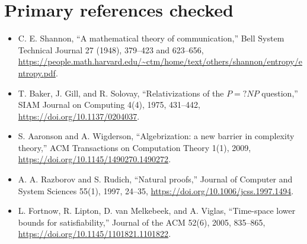 \documentclass[11pt]{article}
\begin{document}
\section*{Primary references checked}
\begin{itemize}
\item C. E. Shannon, ``A mathematical theory of communication,'' Bell System
Technical Journal 27 (1948), 379--423 and 623--656,
\url{https://people.math.harvard.edu/~ctm/home/text/others/shannon/entropy/entropy.pdf}.
\item T. Baker, J. Gill, and R. Solovay, ``Relativizations of the $P=?NP$
question,'' SIAM Journal on Computing 4(4), 1975, 431--442,
\url{https://doi.org/10.1137/0204037}.
\item S. Aaronson and A. Wigderson, ``Algebrization: a new barrier in
complexity theory,'' ACM Transactions on Computation Theory 1(1), 2009,
\url{https://doi.org/10.1145/1490270.1490272}.
\item A. A. Razborov and S. Rudich, ``Natural proofs,'' Journal of Computer
and System Sciences 55(1), 1997, 24--35,
\url{https://doi.org/10.1006/jcss.1997.1494}.
\item L. Fortnow, R. Lipton, D. van Melkebeek, and A. Viglas,
``Time-space lower bounds for satisfiability,'' Journal of the ACM 52(6),
2005, 835--865, \url{https://doi.org/10.1145/1101821.1101822}.
\end{itemize}

\end{document}

